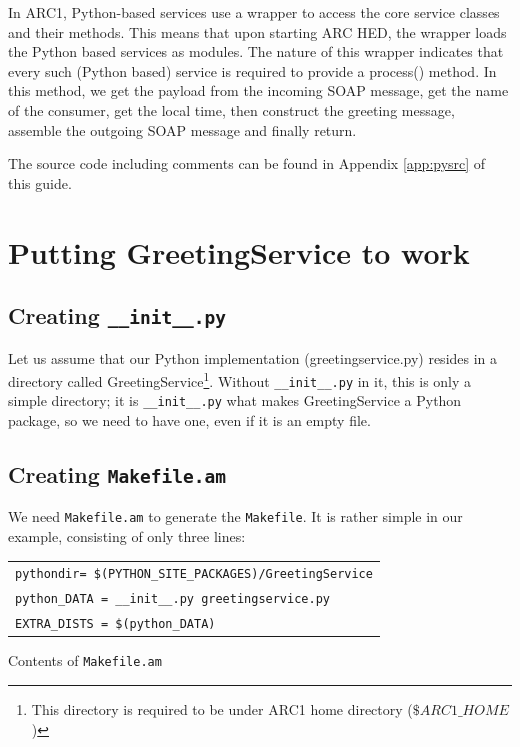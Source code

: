 \documentclass{article}
\begin{document}
In ARC1, Python-based services use a wrapper to access the core service
classes and their methods.
This means that upon starting ARC HED, the wrapper loads the Python based
services as modules. The nature of this wrapper indicates that every
such (Python based) service is required to provide a process()
method. In this method, we get the payload from the incoming SOAP
message, get the name of the consumer, get the local time, then construct
the greeting message, assemble the outgoing SOAP message and finally
return.

The source code including comments can be found in Appendix \ref{app:pysrc}
of this guide.

\newpage

\section{Putting GreetingService to work}

\subsection{Creating \texttt{\_\_init\_\_.py}}

Let us assume that our Python implementation (greetingservice.py)
resides in a directory called GreetingService\footnote[1]{
This directory is required to be under ARC1 home directory ($\$ARC1\_HOME$)}. 
Without \verb#__init__.py# in it, this is only a simple directory; it is
\verb#__init__.py# what makes GreetingService a Python package, so we
need to have one, even if it is an empty file.

\subsection{Creating \texttt{Makefile.am}}

We need \verb#Makefile.am# to generate the \verb#Makefile#. It is
rather simple in our example, consisting of only three lines:

\begin{illustration}
\begin{center}
\begin{tabular}{|l|}
\hline
\verb#pythondir= $(PYTHON_SITE_PACKAGES)/GreetingService#\\ 

\verb#python_DATA = __init__.py greetingservice.py#\\ 

\verb#EXTRA_DISTS = $(python_DATA)#\\
\hline
\end{tabular}
\end{center}
\caption{Contents of \texttt{Makefile.am}}
\end{illustration}
\end{document}
